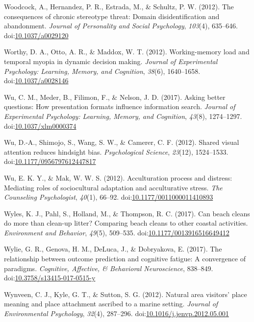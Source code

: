 \documentclass[english,man]{apa6}
\begin{document}
\hypertarget{ref-Woodcock}{}
Woodcock, A., Hernandez, P. R., Estrada, M., \& Schultz, P. W. (2012).
The consequences of chronic stereotype threat: Domain disidentification
and abandonment. \emph{Journal of Personality and Social Psychology},
\emph{103}(4), 635--646.
doi:\href{https://doi.org/10.1037/a0029120}{10.1037/a0029120}

\hypertarget{ref-Worthy2012}{}
Worthy, D. A., Otto, A. R., \& Maddox, W. T. (2012). Working-memory load
and temporal myopia in dynamic decision making. \emph{Journal of
Experimental Psychology: Learning, Memory, and Cognition}, \emph{38}(6),
1640--1658.
doi:\href{https://doi.org/10.1037/a0028146}{10.1037/a0028146}

\hypertarget{ref-Wu2016}{}
Wu, C. M., Meder, B., Filimon, F., \& Nelson, J. D. (2017). Asking
better questions: How presentation formats influence information search.
\emph{Journal of Experimental Psychology: Learning, Memory, and
Cognition}, \emph{43}(8), 1274--1297.
doi:\href{https://doi.org/10.1037/xlm0000374}{10.1037/xlm0000374}

\hypertarget{ref-Wu2012a}{}
Wu, D.-A., Shimojo, S., Wang, S. W., \& Camerer, C. F. (2012). Shared
visual attention reduces hindsight bias. \emph{Psychological Science},
\emph{23}(12), 1524--1533.
doi:\href{https://doi.org/10.1177/0956797612447817}{10.1177/0956797612447817}

\hypertarget{ref-Wu2012}{}
Wu, E. K. Y., \& Mak, W. W. S. (2012). Acculturation process and
distress: Mediating roles of sociocultural adaptation and acculturative
stress. \emph{The Counseling Psychologist}, \emph{40}(1), 66--92.
doi:\href{https://doi.org/10.1177/0011000011410893}{10.1177/0011000011410893}

\hypertarget{ref-Wyles2017}{}
Wyles, K. J., Pahl, S., Holland, M., \& Thompson, R. C. (2017). Can
beach cleans do more than clean-up litter? Comparing beach cleans to
other coastal activities. \emph{Environment and Behavior}, \emph{49}(5),
509--535.
doi:\href{https://doi.org/10.1177/0013916516649412}{10.1177/0013916516649412}

\hypertarget{ref-Wylie2017}{}
Wylie, G. R., Genova, H. M., DeLuca, J., \& Dobryakova, E. (2017). The
relationship between outcome prediction and cognitive fatigue: A
convergence of paradigms. \emph{Cognitive, Affective, \& Behavioral
Neuroscience}, 838--849.
doi:\href{https://doi.org/10.3758/s13415-017-0515-y}{10.3758/s13415-017-0515-y}

\hypertarget{ref-Wynveen2012}{}
Wynveen, C. J., Kyle, G. T., \& Sutton, S. G. (2012). Natural area
visitors' place meaning and place attachment ascribed to a marine
setting. \emph{Journal of Environmental Psychology}, \emph{32}(4),
287--296.
doi:\href{https://doi.org/10.1016/j.jenvp.2012.05.001}{10.1016/j.jenvp.2012.05.001}
\end{document}
